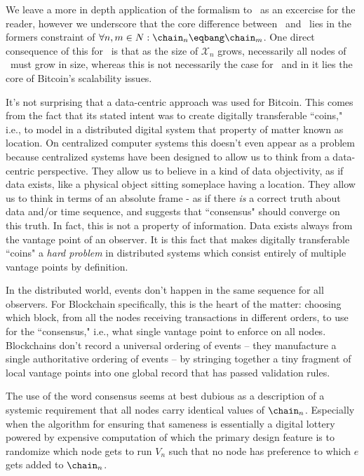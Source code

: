 \documentclass[twocolumn,showpacs,%
  nofootinbib,aps,superscriptaddress,%
  eqsecnum,prd,notitlepage,showkeys,10pt]{revtex4-1}
\begin{document}
We leave a more in depth application of the formalism to \sgit\ as an excercise for the reader, however we underscore that the core difference between  \sbtc\ and \sgit\ lies in the formers constraint of $\forall n,m \in N: \chain_n\eqbang\chain_m$.  One direct consequence of this for \sbtc\ is that as the size of $\mathcal{X}_n$ grows, necessarily all nodes of \sbtc\ must grow in size, whereas this is not necessarily the case for \sgit\, and in it lies the core of Bitcoin's scalability issues.

It's not surprising that a data-centric approach was used for Bitcoin.  This comes from the fact that its stated intent was to create digitally transferable ``coins," i.e., to model in a distributed digital system that property of matter known as location. On centralized computer systems this doesn't even appear as a problem because centralized systems have been designed to allow us to think from a data-centric perspective.  They allow us to believe in a kind of data objectivity, as if data exists, like a physical object sitting someplace having a location. They allow us to think in terms of an absolute frame - as if there \textit{is} a correct truth about data and/or time sequence, and suggests that ``consensus" should converge on this truth. In fact, this is not a property of information.  Data exists always from the vantage point of an observer.  It is this fact that makes digitally transferable ``coins" a \textit{hard problem} in distributed systems which consist entirely of multiple vantage points by definition.

In the distributed world, events don't happen in the same sequence for all observers.  For Blockchain specifically, this is the heart of the matter: choosing which block, from all the nodes receiving transactions in different orders, to use for the ``consensus," i.e., what single vantage point to enforce on all nodes.  Blockchains don't record a universal ordering of events -- they manufacture a single authoritative ordering of events -- by stringing together a tiny fragment of local vantage points into one global record that has passed validation rules.

The use of the word consensus seems at best dubious as a description of a systemic requirement that all nodes carry identical values of $\chain_n$.  Especially when the algorithm for ensuring that sameness is essentially a digital lottery powered by expensive computation of which the primary design feature is to randomize which node gets to run $V_n$ such that no node has preference to which $e$ gets added to $\chain_n$.
\end{document}
